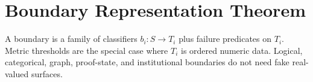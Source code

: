 \section{Boundary Representation Theorem}

A boundary is a family of classifiers \(b_i:S\to T_i\) plus failure predicates on \(T_i\). Metric
thresholds are the special case where \(T_i\) is ordered numeric data. Logical, categorical, graph,
proof-state, and institutional boundaries do not need fake real-valued surfaces.
